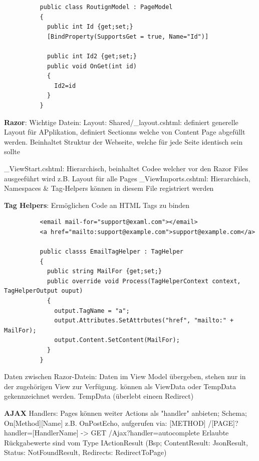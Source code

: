 \documentclass[10pt,landscape]{article}
\begin{document}
\begin{multicols}{3}
\begin{lstlisting}
          public class RoutignModel : PageModel
          {
            public int Id {get;set;}
            [BindProperty(SupportsGet = true, Name="Id")]

            public int Id2 {get;set;}
            public void OnGet(int id)
            {
              Id2=id
            }
          }
        \end{lstlisting}
        \textbf{Razor}: Wichtige Datein: Layout: Shared/\_layout.cshtml: definiert generelle Layout für APplikation, definiert Sectionns welche von Content Page abgefüllt werden.
        Beinhaltet Struktur der Webseite, welche für jede Seite identisch sein sollte

        \_ViewStart.cshtml: Hierarchisch, beinhaltet Codee welcher vor den Razor Files ausgeeführt wird z.B. Layout für alle Pages
        \_ViewImports.cshtml: Hierarchisch, Namespaces \& Tag-Helpers können in diesem File registriert werden

        \textbf{Tag Helpers}: Ermöglichen Code an HTML Tags zu binden
        \begin{lstlisting}
          <email mail-for="support@examl.com"></email>
          <a href="mailto:support@example.com">support@example.com</a>

          public classs EmailTagHelper : TagHelper 
          {
            public string MailFor {get;set;}
            public override void Process(TagHelperContext context, TagHelperOutput ouput)
            {
              output.TagName = "a";
              output.Attributes.SetAttrbutes("href", "mailto:" + MailFor);
              output.Content.SetContent(MailFor);
            }
          }
        \end{lstlisting}
        Daten zwischen Razor-Datein: Daten im View Model übergeben, stehen nur in der zugehörigen View zur Verfügung. können als ViewData oder TempData gekennzeichnet werden.
        TempData (überlebt eineen Redirect)

        \textbf{AJAX}
        Handlers: Pages können weiter Actions als "handler" anbieten; Schema; On[Method][Name] z.B. OnPostEcho, aufgerufen via: [METHOD] /[PAGE]?handler=[HandlerName] -> GET /Ajax?handler=autocomplete
        Erlaubte Rückgabewerte sind vom Type IActionResult (Bsp; ContentResult: JsonResult, Status: NotFoundResult, Redirects: RedirectToPage)


\end{multicols}
\end{document}
